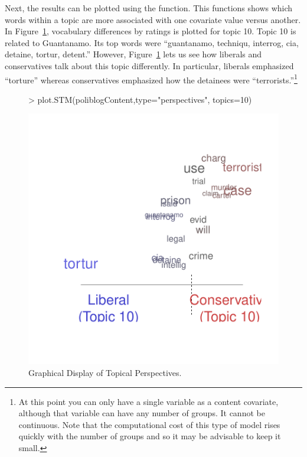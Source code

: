 \documentclass[nojss]{jss}
\begin{document}
\begin{Schunk}
\end{Schunk}

Next, the results can be plotted using the  function.  This functions shows which words within a topic are more associated with one covariate value versus another. In Figure~\ref{fig:perp}, vocabulary differences by ratings is plotted for topic 10. Topic 10 is related to Guantanamo. Its top words were ``guantanamo, techniqu, interrog, cia, detaine, tortur, detent.'' However, Figure~\ref{fig:perp} lets us see how liberals and conservatives talk about this topic differently. In particular, liberals emphasized ``torture'' whereas conservatives emphasized how the detainees were ``terrorists.''\footnote{At this point you can only
 have a single variable as a content covariate, although that variable can have any number of groups. It cannot be continuous. Note that the computational cost of this type of model rises quickly with the number of groups and so it may be advisable to keep it small.}

\begin{figure}[t!]
\begin{center}
\begin{Schunk}
\begin{Sinput}
> plot.STM(poliblogContent,type="perspectives", topics=10)
\end{Sinput}
\end{Schunk}
\includegraphics{stmVignette-016}
\caption{Graphical Display of Topical Perspectives.}
\label{fig:perp}
\end{center}
\end{figure}
\end{document}
